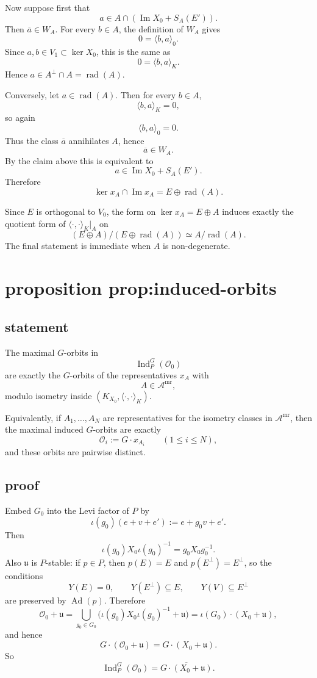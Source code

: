 \documentclass[
  11pt,
]{article}
\begin{document}
Now suppose first that \[
a\in A\cap (\operatorname{Im} X_0+S_A(E')).
\] Then \(\overline a\in W_A\). For every \(b\in A\), the definition of
\(W_A\) gives \[
0=\langle b,a\rangle_0.
\] Since \(a,b\in V_1\subset \ker X_0\), this is the same as \[
0=\langle b,a\rangle_K.
\] Hence \(a\in A^\perp\cap A=\operatorname{rad}(A)\).

Conversely, let \(a\in \operatorname{rad}(A)\). Then for every
\(b\in A\), \[
\langle b,a\rangle_K=0,
\] so again \[
\langle b,a\rangle_0=0.
\] Thus the class \(\overline a\) annihilates \(A\), hence \[
\overline a\in W_A.
\] By the claim above this is equivalent to \[
a\in \operatorname{Im} X_0+S_A(E').
\] Therefore \[
\ker x_A\cap \operatorname{Im} x_A = E\oplus \operatorname{rad}(A).
\]

Since \(E\) is orthogonal to \(V_0\), the form on \(\ker x_A=E\oplus A\)
induces exactly the quotient form of \(\langle\cdot,\cdot\rangle_K|_A\)
on \[
(E\oplus A)/(E\oplus \operatorname{rad}(A))
\simeq A/\operatorname{rad}(A).
\] The final statement is immediate when \(A\) is non-degenerate.

\section{proposition
prop:induced-orbits}\label{proposition-propinduced-orbits}

\subsection{statement}\label{statement-6}

The maximal \(G\)-orbits in \[
\operatorname{Ind}_P^G(\mathcal O_0)
\] are exactly the \(G\)-orbits of the representatives \(x_A\) with \[
A\in \mathscr A^{\mathrm{mr}},
\] modulo isometry inside \((K_{X_0},\langle\cdot,\cdot\rangle_K)\).

Equivalently, if \(A_1,\dots,A_N\) are representatives for the isometry
classes in \(\mathscr A^{\mathrm{mr}}\), then the maximal induced
\(G\)-orbits are exactly \[
\mathcal O_i:=G\cdot x_{A_i}
\qquad (1\le i\le N),
\] and these orbits are pairwise distinct.

\subsection{proof}\label{proof-6}

Embed \(G_0\) into the Levi factor of \(P\) by \[
\iota(g_0)(e+v+e'):=e+g_0v+e'.
\] Then \[
\iota(g_0)X_0\iota(g_0)^{-1}=g_0X_0g_0^{-1}.
\] Also \(\mathfrak u\) is \(P\)-stable: if \(p\in P\), then \(p(E)=E\)
and \(p(E^\perp)=E^\perp\), so the conditions \[
Y(E)=0,\qquad Y(E^\perp)\subseteq E,\qquad Y(V)\subseteq E^\perp
\] are preserved by \(\operatorname{Ad}(p)\). Therefore \[
\mathcal O_0+\mathfrak u
=\bigcup_{g_0\in G_0}\bigl(\iota(g_0)X_0\iota(g_0)^{-1}+\mathfrak u\bigr)
=\iota(G_0)\cdot (X_0+\mathfrak u),
\] and hence \[
G\cdot(\mathcal O_0+\mathfrak u)=G\cdot(X_0+\mathfrak u).
\] So \[
\operatorname{Ind}_P^G(\mathcal O_0)=\overline{G\cdot(X_0+\mathfrak u)}.
\]
\end{document}
